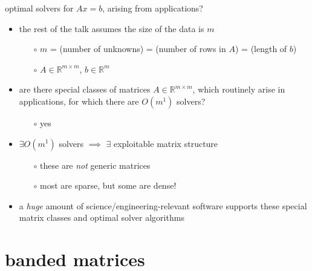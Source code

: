 \documentclass[10pt,
               svgnames,
               hyperref={colorlinks,citecolor=DeepPink4,linkcolor=FireBrick,urlcolor=Maroon},
               usepdftitle=false]{beamer}
\newcommand{\RR}{\mathbb{R}}
\begin{document}
\begin{frame}{optimal solvers for $Ax=b$, arising from applications?}

\begin{itemize}
\item \alert{the rest of the talk assumes the size of the data is $m$}
   \begin{itemize}
   \item[$\circ$] $m$ = (number of unknowns) = (number of rows in $A$) = (length of $b$)
   \item[$\circ$] $A\in\RR^{m\times m}$, $b \in \RR^m$
   \end{itemize}
\item are there special classes of matrices $A\in\RR^{m\times m}$, which routinely arise in applications, for which there are $O(m^1)$ solvers?
   \begin{itemize}
   \item[$\circ$] yes
   \end{itemize}
\item $\exists O(m^1)$ solvers $\implies$ $\exists$ exploitable matrix structure
   \begin{itemize}
   \item[$\circ$] these are \emph{not} generic matrices
   \item[$\circ$] most are sparse, but some are dense!
   \end{itemize}
\item a \emph{huge} amount of science/engineering-relevant software supports these special matrix classes and optimal solver algorithms
\end{itemize}
\end{frame}


\section{banded matrices}
\end{document}
